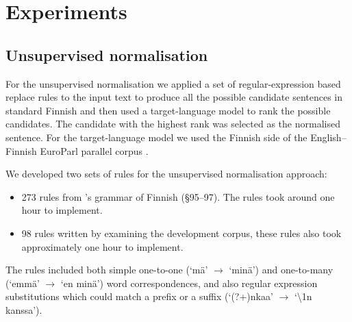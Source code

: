 \documentclass[11pt]{article}
\begin{document}
\section{Experiments}

\subsection{Unsupervised normalisation}

For the unsupervised normalisation we applied a set of regular-expression based 
replace rules to the input text to produce all the possible candidate sentences 
in standard Finnish and then used a target-language model to rank the possible 
candidates. The candidate with the highest rank was selected as the normalised sentence.
For the target-language model we used the Finnish side of the English--Finnish EuroParl
parallel corpus \cite{koehn2005}.

We developed two sets of rules for the unsupervised normalisation approach:

\begin{itemize}
  \item 273 rules from 's grammar of Finnish (\S95--97). The 
    rules took around one hour to implement.
  \item 98 rules written by examining the development corpus, these rules also
    took approximately one hour to implement.
\end{itemize}

The rules included both simple one-to-one (`m\"{a}' $\rightarrow$ `min\"{a}') and one-to-many (`emm\"{a}' $\rightarrow$ `en min\"{a}') word correspondences,
and also regular expression substitutions which could match a prefix or a suffix (`(?+)nkaa' $\rightarrow$ `\textbackslash1n kanssa').
\end{document}
